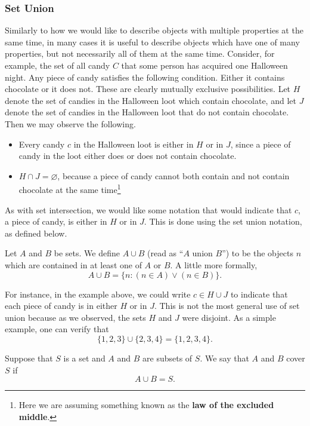\subsubsection{Set Union}
Similarly to how we would like to describe objects with multiple properties at the same time, in many cases it is useful to describe objects which have one of many properties, but not necessarily all of them at the same time.
Consider, for example, the set of all candy $C$ that some person has acquired one Halloween night. Any piece of candy satisfies the following condition. Either it contains chocolate or it does not. These are clearly mutually exclusive possibilities. Let $H$ denote the set of candies in the Halloween loot which contain chocolate, and let $J$ denote the set of candies in the Halloween loot that do not contain chocolate. Then we may observe the following.
\begin{itemize}
	\item Every candy $c$ in the Halloween loot is either in $H$ or in $J$, since a piece of candy in the loot either does or does not contain chocolate.
	\item $H \cap J = \varnothing$, because a piece of candy cannot both contain and not contain chocolate at the same time\footnote{Here we are assuming something known as the \textbf{law of the excluded middle}.}
\end{itemize}

As with set intersection, we would like some notation that would indicate that $c$, a piece of candy, is either in $H$ or in $J$. This is done using the set union notation, as defined below.
\begin{definition}
Let $A$ and $B$ be sets. We define $A \cup B$ (read as ``$A$ union $B$'') to be the objects $n$ which are contained in at least one of $A$ or $B$. A little more formally,
\[A \cup B = \{n \colon (n \in A) \lor (n \in B)\}.\]
\end{definition}
For instance, in the example above, we could write $c \in H \cup J$ to indicate that each piece of candy is in either $H$ or in $J$. This is not the most general use of set union because as we observed, the sets $H$ and $J$ were disjoint. As a simple example, one can verify that 
\[\{1, 2, 3\} \cup \{2, 3, 4\} = \{1, 2, 3, 4\}.\]

\begin{definition}
Suppose that $S$ is a set and $A$ and $B$ are subsets of $S$. We say that $A$ and $B$ cover $S$ if 
\[A \cup B = S.\]
\end{definition}

